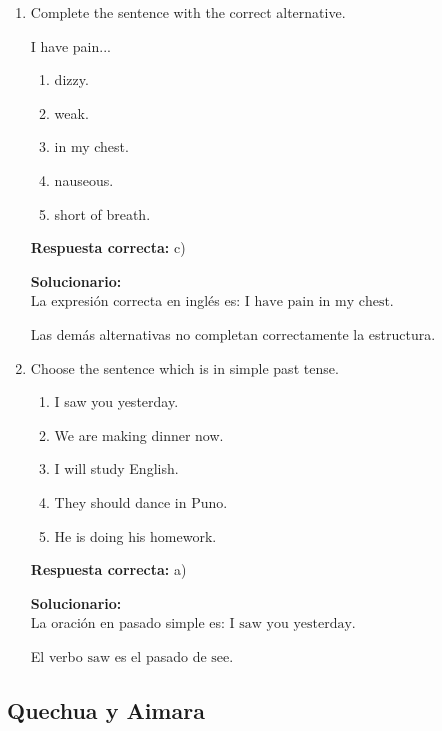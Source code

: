 \begin{enumerate}
	
	
	\item Complete the sentence with the correct alternative.
	
	I have pain...
	\begin{enumerate}[label=\alph*)]
		\item dizzy.
		\item weak.
		\item in my chest.
		\item nauseous.
		\item short of breath.
	\end{enumerate}
	\textbf{Respuesta correcta:} c)
	
	\vspace{2mm}
	\textbf{Solucionario:}\\
	La expresión correcta en inglés es:
	$ \text{I have pain in my chest.} $
	
	Las demás alternativas no completan correctamente la estructura.
	
	\vspace{6mm}
	
	\item Choose the sentence which is in simple past tense.
	\begin{enumerate}[label=\alph*)]
		\item I saw you yesterday.
		\item We are making dinner now.
		\item I will study English.
		\item They should dance in Puno.
		\item He is doing his homework.
	\end{enumerate}
	\textbf{Respuesta correcta:} a)
	
	\vspace{2mm}
	\textbf{Solucionario:}\\
	La oración en pasado simple es:
	$ \text{I saw you yesterday.} $
	
	El verbo $ \text{saw} $ es el pasado de $ \text{see} $.
	
	\vspace{6mm}
	
\end{enumerate}

\subsection*{Quechua y Aimara}

